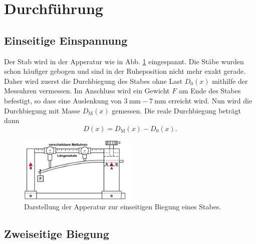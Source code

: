 \section{Durchführung}
\label{sec:Durchführung}
\subsection{Einseitige Einspannung}
Der Stab wird in der Apperatur wie in Abb. \ref{fig:apperatur} eingespannt.
Die Stäbe wurden schon häufiger gebogen und sind in der Ruheposition nicht mehr exakt gerade.
Daher wird zuerst die Durchbiegung des Stabes ohne Last $D_0(x)$ mithilfe der Messuhren vermessen.
Im Anschluss wird ein Gewicht $F$ am Ende des Stabes befestigt, so dass eine Auslenkung von $\SI{3}{\mm} - \SI{7}{\mm}$ erreicht wird.
Nun wird die Durchbiegung mit Masse $D_\text{M}(x)$ gemessen.
Die reale Durchbiegung beträgt dann
\begin{equation}
    D(x) = D_\text{M}(x) - D_0(x) .
    \label{eqb:D_real}
\end{equation}

\begin{figure}
    \centering
    \includegraphics[width=0.5\textwidth]{content/data/apperatur.jpg}
    \caption{Darstellung der Apperatur zur einseitigen Biegung eines Stabes. \cite{anleitung}}
    \label{fig:apperatur}
\end{figure}

\subsection{Zweiseitige Biegung}
